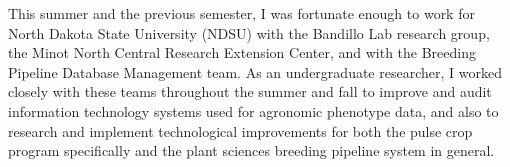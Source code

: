 \documentclass[12pt, letterpaper,oneocolumn]{article}
\begin{document}
\begin{appendices}
This summer and the previous semester, I was fortunate enough to work for North Dakota State University (NDSU) with the Bandillo Lab research group, the Minot North Central Research Extension Center, and with the Breeding Pipeline Database Management team. As an undergraduate researcher, I worked closely with these teams throughout the summer and fall to improve and audit information technology systems used for agronomic phenotype data, and also to research and implement technological improvements for both the pulse crop program specifically and the plant sciences breeding pipeline system in general.

	\end{appendices}



\end{document}
